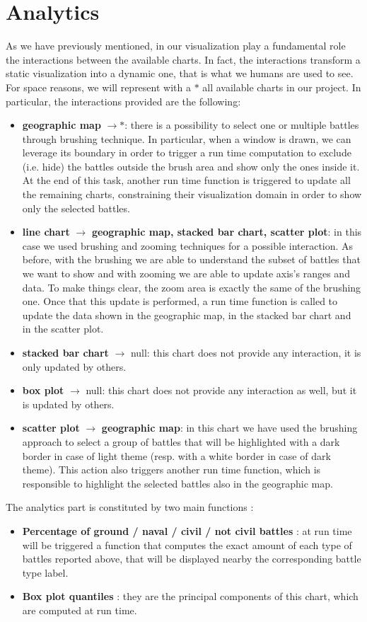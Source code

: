 \section{Analytics}
As we have previously mentioned, in our visualization play a fundamental role the interactions between the available charts. In fact, the interactions transform a static visualization into a dynamic one, that is what we humans are used to see. For space reasons, we will represent with a $*$ all available charts in our project. In particular, the interactions provided are the following:
\begin{itemize}
    \item \textbf{geographic map} $\rightarrow *$: there is a possibility to select one or multiple battles through brushing technique. In particular, when a window is drawn, we can leverage its boundary in order to trigger a run time computation to exclude (i.e. hide) the battles outside the brush area and show only the ones inside it. At the end of this task, another run time function is triggered to update all the remaining charts, constraining their visualization domain in order to show only the selected battles.
    \item \textbf{line chart} $\rightarrow$ \textbf{geographic map, stacked bar chart, scatter plot}: in this case we used brushing and zooming techniques for a possible interaction. As before, with the brushing we are able to understand the subset of battles that we want to show and with zooming we are able to update axis's ranges and data. To make things clear, the zoom area is exactly the same of the brushing one. Once that this update is performed, a run time function is called to update the data shown in the geographic map, in the stacked bar chart and in the scatter plot.
    \item \textbf{stacked bar chart} $\rightarrow$ null: this chart does not provide any interaction, it is only updated by others.
    \item \textbf{box plot} $\rightarrow$ null: this chart does not provide any interaction as well, but it is updated by others.
    \item \textbf{scatter plot} $\rightarrow$ \textbf{geographic map}: in this chart we have used the brushing approach to select a group of battles that will be highlighted with a dark border in case of light theme (resp. with a white border in case of dark theme). This action also triggers another run time function, which is responsible to highlight the selected battles also in the geographic map. 
\end{itemize}
The analytics part is constituted by two main functions :
\begin{itemize}
\item \textbf{Percentage of ground / naval / civil / not civil battles} : at run time will be triggered a function that computes the exact amount of each type of battles reported above, that will be displayed nearby the corresponding battle type label.
\item \textbf{Box plot quantiles} : they are the principal components of this chart, which are computed at run time.
\end{itemize}
